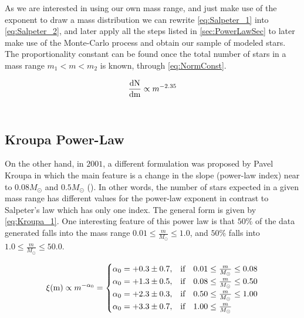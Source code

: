 As we are interested in using our own mass range, and just make use of the exponent to draw a mass distribution we can rewrite \autoref{eq:Salpeter_1} into \autoref{eq:Salpeter_2}, and later apply all the steps listed in \autoref{sec:PowerLawSec} to later make use of the Monte-Carlo process and obtain our sample of modeled stars. The proportionality constant can be found once the total number of stars in a mass range $m_1 < m < m_2$ is known, through \autoref{eq:NormConst}.

\begingroup
\Large
\begin{equation}
  \frac{\textnormal{dN}}{\textnormal{dm}} \propto m^{-2.35}
 \label{eq:Salpeter_2}
\end{equation}
\endgroup\\

\subsection{Kroupa Power-Law} \label{subsec:Kroupa}

On the other hand, in $2001$, a different formulation was proposed by Pavel Kroupa in which the main feature is a change in the slope (power-law index) near to $0.08M_\odot$ and $0.5M_\odot$  (\citeyear{2001MNRAS.322..231K}). In other words, the number of stars expected in a given mass range has different values for the power-law exponent in contrast to Salpeter's law which has only one index. The general form is given by \autoref{eq:Kroupa_1}. One interesting feature of this power law is that $50\%$ of the data generated falls into the mass range $0.01 \leq \frac{m}{M_\odot} \leq 1.0$, and $50\%$ falls into $1.0 \leq \frac{m}{M_\odot} \leq 50.0$. 

\begingroup
\Large
\begin{equation}
    \xi(\textnormal{m}) \propto m^{-\alpha_0} = 
    \begin{cases}
     \alpha_0 = +0.3 \pm 0.7,& \text{if } ~~ 0.01 \leq \frac{m}{M_\odot} \leq 0.08\\
     \alpha_0 = +1.3 \pm 0.5,& \text{if } ~~ 0.08 \leq \frac{m}{M_\odot} \leq 0.50\\
     \alpha_0 = +2.3 \pm 0.3,& \text{if } ~~ 0.50 \leq \frac{m}{M_\odot} \leq 1.00\\
     \alpha_0 = +3.3 \pm 0.7,& \text{if } ~~ 1.00 \leq \frac{m}{M_\odot}
    \end{cases}
\label{eq:Kroupa_1}
\end{equation}
\endgroup\\


